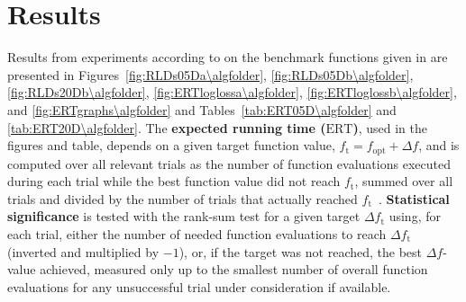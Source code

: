 \documentclass{article}
\newcommand{\ERT}{\ensuremath{\mathrm{ERT}}}
\newcommand{\Df}{\ensuremath{\Delta f}}
\newcommand{\fopt}{\ensuremath{f_\mathrm{opt}}}
\newcommand{\ftarget}{\ensuremath{f_\mathrm{t}}}
\begin{document}
\section{Results}
Results from experiments according to \cite{hansen2010exp} on the
benchmark functions given in \cite{wp200901_2010,hansen2010fun} are presented
in Figures~\ref{fig:RLDs05Da\algfolder}, \ref{fig:RLDs05Db\algfolder},
\ref{fig:RLDs20Db\algfolder},
\ref{fig:ERTloglossa\algfolder}, \ref{fig:ERTloglossb\algfolder},
and \ref{fig:ERTgraphs\algfolder} and 
Tables~\ref{tab:ERT05D\algfolder} and \ref{tab:ERT20D\algfolder}.
The \textbf{expected running time (\ERT)}, used in the figures and table,
depends on a given target function value, $\ftarget=\fopt+\Df$, and is computed
over all relevant trials as the number of function evaluations executed during
each trial while the best function value did not reach \ftarget, summed over
all trials and divided by the number of trials that actually reached \ftarget\
\cite{hansen2010exp,price1997dev}.
\textbf{Statistical significance} is tested with the rank-sum test for a given
target $\Delta\ftarget$ using, for each trial, either the number of needed
function evaluations to reach $\Delta\ftarget$ (inverted and multiplied by
$-1$), or, if the target was not reached, the best $\Df$-value achieved,
measured only up to the smallest number of overall function evaluations for any
unsuccessful trial under consideration if available.
\end{document}
